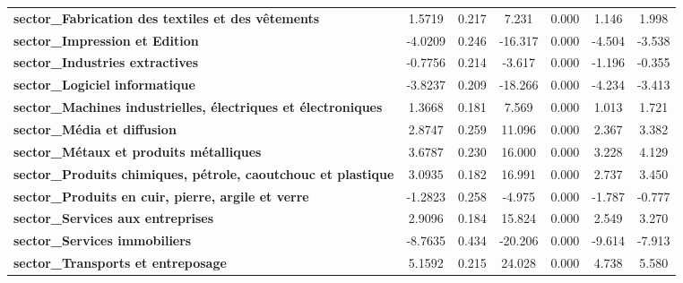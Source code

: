 \begin{center}
\begin{tabular}{lcccccc}
\textbf{sector\_Fabrication des textiles et des vêtements}            &       1.5719  &        0.217     &     7.231  &         0.000        &        1.146    &        1.998     \\
\textbf{sector\_Impression et Edition}                                &      -4.0209  &        0.246     &   -16.317  &         0.000        &       -4.504    &       -3.538     \\
\textbf{sector\_Industries extractives}                               &      -0.7756  &        0.214     &    -3.617  &         0.000        &       -1.196    &       -0.355     \\
\textbf{sector\_Logiciel informatique}                                &      -3.8237  &        0.209     &   -18.266  &         0.000        &       -4.234    &       -3.413     \\
\textbf{sector\_Machines industrielles, électriques et électroniques} &       1.3668  &        0.181     &     7.569  &         0.000        &        1.013    &        1.721     \\
\textbf{sector\_Média et diffusion}                                   &       2.8747  &        0.259     &    11.096  &         0.000        &        2.367    &        3.382     \\
\textbf{sector\_Métaux et produits métalliques}                       &       3.6787  &        0.230     &    16.000  &         0.000        &        3.228    &        4.129     \\
\textbf{sector\_Produits chimiques, pétrole, caoutchouc et plastique} &       3.0935  &        0.182     &    16.991  &         0.000        &        2.737    &        3.450     \\
\textbf{sector\_Produits en cuir, pierre, argile et verre}            &      -1.2823  &        0.258     &    -4.975  &         0.000        &       -1.787    &       -0.777     \\
\textbf{sector\_Services aux entreprises}                             &       2.9096  &        0.184     &    15.824  &         0.000        &        2.549    &        3.270     \\
\textbf{sector\_Services immobiliers}                                 &      -8.7635  &        0.434     &   -20.206  &         0.000        &       -9.614    &       -7.913     \\
\textbf{sector\_Transports et entreposage}                            &       5.1592  &        0.215     &    24.028  &         0.000        &        4.738    &        5.580     \\

\end{tabular}
\end{center}
